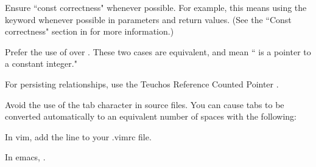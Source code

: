 \be
\item Ensure ``const correctness" whenever possible. For example, this means using the  keyword whenever possible
      in parameters and return values. (See the ``Const correctness" section in \cite{Cl2010} for more information.)
\item Prefer the use of  over .  These two cases are equivalent, and mean `` is a pointer to
a constant integer."
\item For persisting relationships, use the Teuchos Reference Counted Pointer \cite{Ba2007,Ba2010}.
\item Avoid the use of the tab character in source files.  You can cause tabs to be converted automatically to an equivalent
number of spaces with the following:
  \be
     \item In vim, add the line  to your .vimrc file.
     \item In emacs, .
  \ee
\ee
